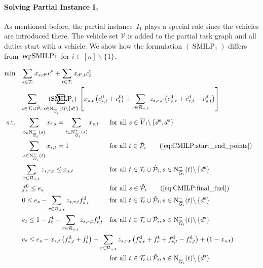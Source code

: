 \paragraph{Solving Partial Instance $\boldsymbol{I_1}$} \parfill

As mentioned before, the partial instance~$I_1$ plays a special role since the vehicles are introduced there. The vehicle set $\mathcal{V}$ is added to the partial task graph and all duties start with a vehicle. We show how the formulation $(\operatorname{SMILP}_1)$ differs from $\eqref{eq:SMILPi}$ for ${i\in[n]\backslash\{1\}}$.

\begin{align}
	\min \quad & \omit\rlap{$\displaystyle{\sum_{s\in\Ti} x_{s,\de}\cv + \sum_{t\in\Ti} x_{\ds, t}\ct_t}$} \nonumber \\
	& \omit\rlap{$\displaystyle{\sum_{t\in\Ti\cup\Phat_i}\sum_{s\in\Ninoi(t)\backslash\left\{\ds\right\}}\left[x_{s,t}\left(\cd_{s,t}+\ct_t\right)+\sum_{r\in\Rst}z_{s,r,t}\left(\cd_{s,r}+\cd_{r,t}-\cd_{s,t}\right)\right]}$} \tag{$\operatorname{SMILP}_i$} \label{eq:SMILPi} \\
	\text{s.t.} \quad & \sum_{t\in\Ninoi(s)} x_{t,s} = \sum_{t\in\Noutoi(s)} x_{s,t} & & \text{for all } s\in \overline{V}_i\backslash\left\{\ds,\de\right\} \label{eq:CMILP:flow} \\
	& \sum_{s\in\Ninoi(t)} x_{s,t} = 1 && \text{for all } t\in\Phat_i \tag{\ref{eq:CMILP:start_end_points}} \\	
	& \sum_{r\in\Rst} z_{s,r,t} \leq x_{s,t} && \text{for all } t\in\Ti\cup\Phat_i, s\in\Ninoi(t)\backslash\left\{\ds\right\} \label{eq:CMILP:refuel} \\
	& f^0_s \leq e_s && \text{for all } s\in\Phat_i \tag{\ref{eq:CMILP:final_fuel}} \\
	& 0 \leq e_s - \sum_{r\in\Rst} z_{s,r,t}\fd_{s,r} & & \text{for all } t\in\Ti\cup\Phat_i, s\in\Ninoi(t)\backslash\left\{\ds\right\} \label{eq:CMILP:min_fuel} \\
	& e_t \leq 1 - \ft_t - \sum_{r\in\Rst} z_{s,r,t}\fd_{r,t} & & \text{for all } t\in\Ti\cup\Phat_i, s\in\Ninoi(t)\backslash\left\{\ds\right\} \label{eq:CMILP:max_fuel} \\
	& \omit\rlap{$\displaystyle{e_t \leq e_s - x_{s,t}\left(f_{s,t}^{\operatorname{d}}+f_t^{\operatorname{t}}\right) - \sum_{r\in\Rst} z_{s,r,t}\left(\fd_{s,r}+\ft_r+\fd_{r,t}-\fd_{s,t}\right) + \left(1-x_{s,t}\right)}$} \nonumber \\
	& & & \text{for all } t\in\Ti\cup\Phat_i, s\in\Ninoi(t)\backslash\left\{\ds\right\} \label{eq:CMILP:fuel_consumption} \\

\end{align}
